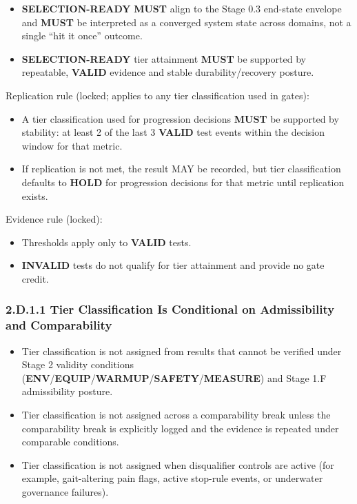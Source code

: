 \documentclass[10pt]{article}
\begin{document}
\begin{itemize}
\item \textbf{SELECTION-READY} \textbf{MUST} align to the Stage 0.3 end-state envelope and \textbf{MUST} be interpreted as a converged system state across domains, not a single “hit it once” outcome.
\item \textbf{SELECTION-READY} tier attainment \textbf{MUST} be supported by repeatable, \textbf{VALID} evidence and stable durability/recovery posture.
\end{itemize}

Replication rule (locked; applies to any tier classification used in gates):

\begin{itemize}
\item A tier classification used for progression decisions \textbf{MUST} be supported by stability: at least 2 of the last 3 \textbf{VALID} test events within the decision window for that metric.
\item If replication is not met, the result MAY be recorded, but tier classification defaults to \textbf{HOLD} for progression decisions for that metric until replication exists.
\end{itemize}

Evidence rule (locked):

\begin{itemize}
\item Thresholds apply only to \textbf{VALID} tests.
\item \textbf{INVALID} tests do not qualify for tier attainment and provide no gate credit.
\end{itemize}

\subsubsection*{2.D.1.1 Tier Classification Is Conditional on Admissibility and Comparability}
\begin{itemize}
\item Tier classification is not assigned from results that cannot be verified under Stage 2 validity conditions (\textbf{ENV}/\textbf{EQUIP}/\textbf{WARMUP}/\textbf{SAFETY}/\textbf{MEASURE}) and Stage 1.F admissibility posture.
\item Tier classification is not assigned across a comparability break unless the comparability break is explicitly logged and the evidence is repeated under comparable conditions.
\item Tier classification is not assigned when disqualifier controls are active (for example, gait-altering pain flags, active stop-rule events, or underwater governance failures).
\end{itemize}
\end{document}
